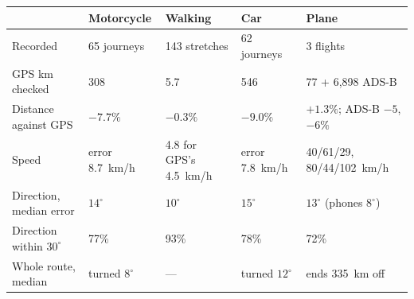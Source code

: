 \begin{tabular}{@{}lllll@{}}
\toprule
 & Motorcycle & Walking & Car & Plane\\
\midrule
Recorded & 65 journeys & 143 stretches & 62 journeys & 3 flights \\
GPS km checked & 308 & 5.7 & 546 & 77 + 6{,}898 ADS-B \\
Distance against GPS & $-7.7\%$ & $-0.3\%$ & $-9.0\%$ & $+1.3\%$; ADS-B $-5$, $-6\%$ \\
Speed & error 8.7~km/h & 4.8 for GPS's 4.5~km/h & error 7.8~km/h & 40/61/29, 80/44/102~km/h \\
Direction, median error & $14^\circ$ & $10^\circ$ & $15^\circ$ & $13^\circ$ (phones $8^\circ$) \\
Direction within $30^\circ$ & 77\% & 93\% & 78\% & 72\% \\
Whole route, median & turned $8^\circ$ & --- & turned $12^\circ$ & ends 335~km off \\
\bottomrule
\end{tabular}
